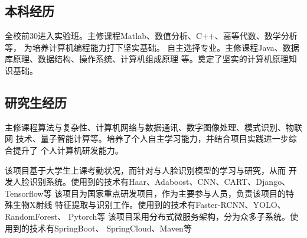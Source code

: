 \documentclass[
  a4paper, 11pt
]{MyStyle}
\begin{document}
\makefrontsidebar


    \subsection{本科经历}
    \begin{cvtable}
        \cvitem{}{}{}{}
            {全校前30进入实验班。主修课程Matlab、数值分析、C++、高等代数、数学分析等，
            为培养计算机编程能力打下坚实基础。}
            {自主选择专业。主修课程Java、数据库原理、数据结构、操作系统、计算机组成原理
            等。奠定了坚实的计算机原理知识基础。}
    \end{cvtable}

    \subsection{研究生经历}
    \begin{cvtable}
            {主修课程算法与复杂性、计算机网络与数据通讯、数字图像处理、模式识别、物联网
            技术、量子智能计算等。培养了个人自主学习能力，并结合项目实践进一步综合提升了
            个人计算机研发能力。}
    \end{cvtable}

    \begin{cvtable}
            {该项目基于大学生上课考勤状况，而针对与人脸识别模型的学习与研究，从而
            开发人脸识别系统。使用到的技术有Haar、Adaboost、CNN、CART、Django、
            Tensorflow等}
            {该项目为国家重点研发项目，作为主要参与人员，负责该项目的特殊生物X射线
            特征提取与识别工作。使用到的技术有Faster-RCNN、YOLO、RandomForest、
            Pytorch等}
            {该项目采用分布式微服务架构，分为众多子系统。使用到的技术有SpringBoot、
            SpringCloud、Maven等}
    \end{cvtable}

    \begin{cvtable}
    \end{cvtable}
\end{document}

